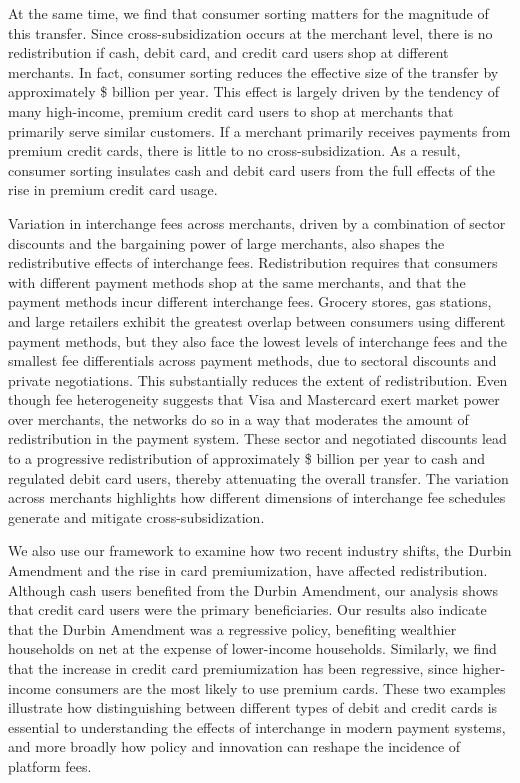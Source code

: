 \documentclass[main.tex]{subfiles}
\begin{document}
At the same time, we find that consumer sorting matters for the magnitude of this transfer.
Since cross-subsidization occurs at the merchant level, there is no redistribution if cash, debit card, and credit card users shop at different merchants.
In fact, consumer sorting reduces the effective size of the transfer by approximately \$ billion per year.
This effect is largely driven by the tendency of many high-income, premium credit card users to shop at merchants that primarily serve similar customers.
If a merchant primarily receives payments from premium credit cards, there is little to no cross-subsidization.
As a result, consumer sorting insulates cash and debit card users from the full effects of the rise in premium credit card usage.

Variation in interchange fees across merchants, driven by a combination of sector discounts and the bargaining power of large merchants, also shapes the redistributive effects of interchange fees.
Redistribution requires that consumers with different payment methods shop at the same merchants, and that the payment methods incur different interchange fees.
Grocery stores, gas stations, and large retailers exhibit the greatest overlap between consumers using different payment methods, but they also face the lowest levels of interchange fees and the smallest fee differentials across payment methods, due to sectoral discounts and private negotiations. This substantially reduces the extent of redistribution.  
Even though fee heterogeneity suggests that Visa and Mastercard exert market power over merchants, the networks do so in a way that moderates the amount of redistribution in the payment system.
These sector and negotiated discounts lead to a progressive redistribution of approximately \$ billion per year to cash and regulated debit card users, thereby attenuating the overall transfer. The variation across merchants highlights how different dimensions of interchange fee schedules generate and mitigate cross-subsidization.

We also use our framework to examine how two recent industry shifts, the Durbin Amendment and the rise in card premiumization, have affected redistribution.
Although cash users benefited from the Durbin Amendment, our analysis shows that credit card users were the primary beneficiaries.
Our results also indicate that the Durbin Amendment was a regressive policy, benefiting wealthier households on net at the expense of lower-income households.
Similarly, we find that the increase in credit card premiumization has been regressive, since higher-income consumers are the most likely to use premium cards. These two examples illustrate how distinguishing between different types of debit and credit cards is essential to understanding the effects of interchange in modern payment systems, and more broadly how policy and innovation can reshape the incidence of platform fees.
\end{document}
